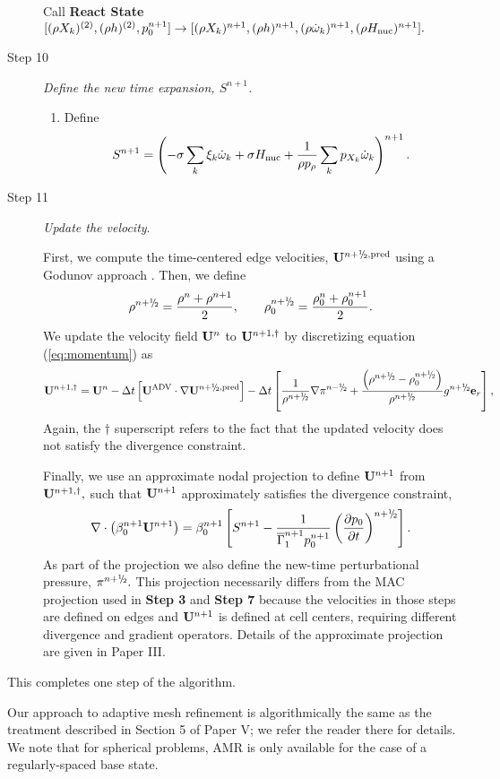 \begin{description}
Call {\bf React State}$[(\rho X_k)^{(2)},(\rho h)^{(2)}, p_0^{n+1}] \rightarrow [(\rho X_k)^{n+1}, (\rho h)^{n+1}, (\rho \dot\omega_k)^{n+1}, (\rho H_{\rm nuc})^{n+1}].$

\item[Step 10] {\em Define the new time expansion, $S^{n+1}$.}

\begin{enumerate}
\renewcommand{\theenumi}{{\bf \Alph{enumi}}}
\item Define
\begin{equation}
  S^{n+1} =  \left(-\sigma  \sum_k  \xi_k \omegadot_k  + \sigma \Hnuc +
  \frac{1}{\rho p_\rho} \sum_k p_{X_k}  \omegadot_k\right)^{n+1}.
\end{equation}

\end{enumerate}


\item[Step 11] {\em Update the velocity}.

First, we compute the time-centered edge velocities, $\Ub^{\nph,\pred}$
using a Godunov approach \citep{XRB_III}. Then, we define
\begin{equation}
\rho^\nph = \frac{\rho^n + \rho^{n+1}}{2}, \qquad \rho_0^\nph = \frac{\rho_0^n + \rho_0^{n+1}}{2}.
\end{equation}
We update the velocity field ${\bf{U}}^n$ to ${\bf{U}}^{n+1,\dagger}$ by discretizing
equation (\ref{eq:momentum}) as
\begin{equation}
\Ub^{n+1,\dagger}
= \Ub^n - \dt \left[\uadvtwo \cdot \nabla \Ub^{\nph,\pred} \right]
 - \dt \left[ \frac{1}{\rho^\nph} \nabla \pi^\nmh + \frac{\left(\rho^\nph-\rho_0^\nph\right)}{\rho^\nph} g^{\nph} \eb_r \right],
\end{equation}
Again, the $\dagger$ superscript refers
to the fact that the updated velocity does not satisfy the divergence
constraint.

Finally, we use an approximate nodal projection to define ${\bf{U}}^{n+1}$
from ${\bf{U}}^{n+1,\dagger},$  such that ${\bf{U}}^{n+1}$ approximately
satisfies the divergence constraint,
\begin{equation}
\nabla \cdot \left(\beta_0^{n+1} \Ub^{n+1} \right) = \beta_0^{n+1} \left[ S^{n+1} - \frac{1}{\gammaonebar^{n+1}p_0^{n+1}}\left(\frac{\partial p_0}{\partial t}\right)^{\nph}\right].\label{eq:div3}
\end{equation}
As part of the projection we also define the new-time perturbational pressure,
$\pi^\nph.$  This projection necessarily differs from the MAC projection used in
{\bf Step 3} and {\bf Step 7} because the velocities in those steps are defined
on edges and ${\bf{U}}^{n+1}$ is defined at cell centers, requiring different divergence
and gradient operators.  Details of the approximate projection are given in Paper III.

\end{description}
This completes one step of the algorithm.

Our approach to adaptive mesh refinement is algorithmically the same as the treatment described in Section 5 of Paper V; we refer the reader there for details.
We note that for spherical problems, AMR is only available for the case of a regularly-spaced base state.
